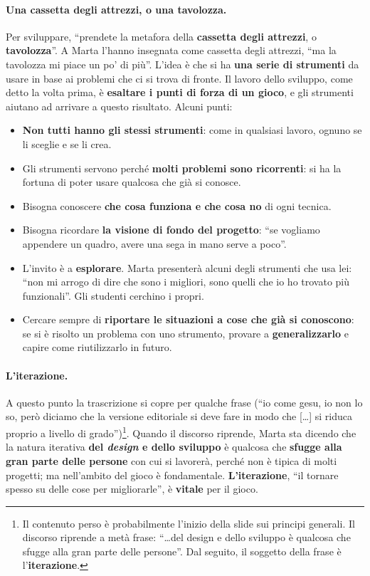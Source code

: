 \paragraph{Una cassetta degli attrezzi, o una tavolozza.} Per sviluppare, ``prendete la
metafora della \textbf{cassetta degli attrezzi}, o \textbf{tavolozza}''. A Marta l'hanno
insegnata come cassetta degli attrezzi, ``ma la tavolozza mi piace un po' di più''. L'idea è
che si ha \textbf{una serie di strumenti} da usare in base ai problemi che ci si trova di
fronte. Il lavoro dello sviluppo, come detto la volta prima, è \textbf{esaltare i punti di
forza di un gioco}, e gli strumenti aiutano ad arrivare a questo risultato. Alcuni punti:
\begin{itemize}
  \item \textbf{Non tutti hanno gli stessi strumenti}: come in qualsiasi lavoro, ognuno se li
        sceglie e se li crea.
  \item Gli strumenti servono perché \textbf{molti problemi sono ricorrenti}: si ha la
        fortuna di poter usare qualcosa che già si conosce.
  \item Bisogna conoscere \textbf{che cosa funziona e che cosa no} di ogni tecnica.
  \item Bisogna ricordare \textbf{la visione di fondo del progetto}: ``se vogliamo appendere
        un quadro, avere una sega in mano serve a poco''.
  \item L'invito è a \textbf{esplorare}. Marta presenterà alcuni degli strumenti che usa
        lei: ``non mi arrogo di dire che sono i migliori, sono quelli che io ho trovato più
        funzionali''. Gli studenti cerchino i propri.
  \item Cercare sempre di \textbf{riportare le situazioni a cose che già si conoscono}: se si
        è risolto un problema con uno strumento, provare a \textbf{generalizzarlo} e capire
        come riutilizzarlo in futuro.
\end{itemize}

\paragraph{L'iterazione.} A questo punto la trascrizione si copre per qualche frase (``io
come gesu, io non lo so, però diciamo che la versione editoriale si deve fare in modo che
[\ldots] si riduca proprio a livello di grado'')\footnote{Il contenuto perso è
probabilmente l'inizio della slide sui principi generali. Il discorso riprende a metà frase:
``\ldots del design e dello sviluppo è qualcosa che sfugge alla gran parte delle persone''.
Dal seguito, il soggetto della frase è l'\textbf{iterazione}.}. Quando il discorso riprende,
Marta sta dicendo che la natura iterativa \textbf{del \emph{design} e dello sviluppo} è
qualcosa che \textbf{sfugge alla gran parte delle persone} con cui si lavorerà, perché non è
tipica di molti progetti; ma nell'ambito del gioco è fondamentale. \textbf{L'iterazione},
``il tornare spesso su delle cose per migliorarle'', è \textbf{vitale} per il gioco.

